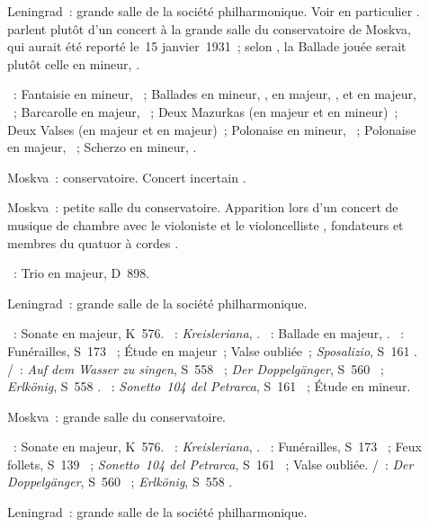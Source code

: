 \begin{description}
 \item[]
 Leningrad~: grande salle de la société philharmonique.
 Voir en particulier \citet[p.~444]{Milshteyn82a}.
 \citet[p.~402]{Scriabine} parlent plutôt d'un concert à la grande salle du
 conservatoire de Moskva, qui aurait été reporté le~15 janvier~1931~; selon
 \citeauthor{Scriabine}, la Ballade jouée serait plutôt celle en \kF mineur,
 .

 \textsc{\Chopin{}}~: Fantaisie en \kF mineur, ~; Ballades en \kG
 mineur, , en \kF majeur, , et en \kA \Flat majeur,
 ~; Barcarolle en \kF \Sharp majeur, ~; Deux Mazurkas (en
 \kC majeur et en \kA mineur)~; Deux Valses (en \kA \Flat majeur et en \kD
 \Flat majeur)~; Polonaise en \kF \Sharp mineur, ~; Polonaise en
 \kA \Flat majeur, ~; Scherzo en \kB mineur, .
 \item[]
 Moskva~: conservatoire.
 Concert incertain \citep[p.~402]{Scriabine}.
 \item[]
 Moskva~: petite salle du conservatoire.
 Apparition lors d'un concert de musique de chambre avec le violoniste
 \DTziganov{} et le violoncelliste \SShirinsky{}, fondateurs et membres du
 quatuor à cordes \Beethoven{}.

 \textsc{\Schubert{}}~: Trio en \kB \Flat majeur, D~898.
 \item[]
 Leningrad~: grande salle de la société philharmonique.

 \textsc{\Mozart{}}~: Sonate en \kD majeur, K~576.
 \textsc{\Schumann{}}~: \emph{Kreisleriana}, .
 \textsc{\Chopin{}}~: Ballade  en \kA \Flat majeur, .
 \textsc{\Liszt{}}~: Funérailles, S~173 ~; Étude en \kB \Flat
 majeur~; Valse oubliée~; \emph{Sposalizio}, S~161 .
 \textsc{\Schubert{}/\Liszt{}}~: \emph{Auf dem Wasser zu singen}, S~558
 ~; \emph{Der Doppelgänger}, S~560 ~; \emph{Erlkönig},
 S~558 .
 \textsc{\Liszt{}}~: \emph{Sonetto~104 del Petrarca}, S~161 ~;
 Étude en \kF mineur.
 \item[]
 Moskva~: grande salle du conservatoire.

 \textsc{\Mozart{}}~: Sonate en \kD majeur, K~576.
 \textsc{\Schumann{}}~: \emph{Kreisleriana}, .
 \textsc{\Liszt{}}~: Funérailles, S~173 ~; Feux follets, S~139
 ~; \emph{Sonetto~104 del Petrarca}, S~161 ~; Valse
 oubliée.
 \textsc{\Schubert{}/\Liszt{}}~: \emph{Der Doppelgänger}, S~560
 ~; \emph{Erlkönig}, S~558 .
 \item[]
 Leningrad~: grande salle de la société philharmonique.


\end{description}
